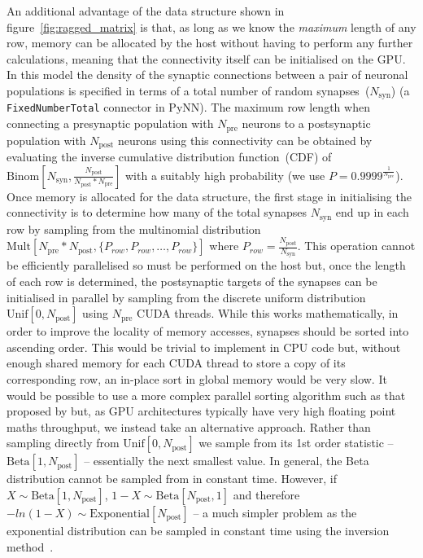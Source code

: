 \documentclass[utf8]{frontiersSCNS} %
\begin{document}
An additional advantage of the data structure shown in figure~\ref{fig:ragged_matrix} is that, as long as we know the \textit{maximum} length of any row, memory can be allocated by the host without having to perform any further calculations, meaning that the connectivity itself can be initialised on the GPU.
In this model the density of the synaptic connections between a pair of neuronal populations is specified in terms of a total number of random synapses~($N_{\text{syn}}$) (a \lstinline{FixedNumberTotal} connector in PyNN).
The maximum row length when connecting a presynaptic population with $N_{\text{pre}}$ neurons to a postsynaptic population with $N_{\text{post}}$ neurons using this connectivity can be obtained by evaluating the inverse cumulative distribution function~(CDF) of $\text{Binom}[N_{\text{syn}}, \frac{N_{\text{post}}}{N_{\text{post}} * N_{\text{pre}}}]$ with a suitably high probability (we use $P=0.9999^\frac{1}{N_{\text{pre}}}$).
Once memory is allocated for the data structure, the first stage in initialising the connectivity is to determine how many of the total synapses $N_{\text{syn}}$ end up in each row by sampling from the multinomial distribution $\text{Mult}[N_{\text{pre}} * N_{\text{post}}, \{P_{row}, P_{row}, \ldots, P_{row}\}]$ where $P_{row} = \frac{N_{\text{post}}}{N_{\text{syn}}}$.
This operation cannot be efficiently parallelised so must be performed on the host but, once the length of each row is determined, the postsynaptic targets of the synapses can be initialised in parallel by sampling from the discrete uniform distribution $\text{Unif}[0, N_{\text{post}}]$ using $N_{\text{pre}}$ CUDA threads.
While this works mathematically, in order to improve the locality of memory accesses, synapses should be sorted into ascending order.
This would be trivial to implement in CPU code but, without enough shared memory for each CUDA thread to store a copy of its corresponding row, an in-place sort in global memory would be very slow.
It would be possible to use a more complex parallel sorting algorithm such as that proposed by \citet{Awan2016} but, as GPU architectures typically have very high floating point maths throughput, we instead take an alternative approach.
Rather than sampling directly from $\text{Unif}[0, N_{\text{post}}]$ we sample from its 1st order statistic -- $\text{Beta}[1, N_{\text{post}}]$ -- essentially the next smallest value.
In general, the Beta distribution cannot be sampled from in constant time.
However, if $X \sim \text{Beta}[1, N_{\text{post}}]$, $1 - X \sim \text{Beta}[N_{\text{post}}, 1]$ and therefore $-ln(1 - X) \sim \text{Exponential}[N_{\text{post}}]$ -- a much simpler problem as the exponential distribution can be sampled in constant time using the inversion method~\citep[p29]{DevroyeLuc2013}.
\end{document}
